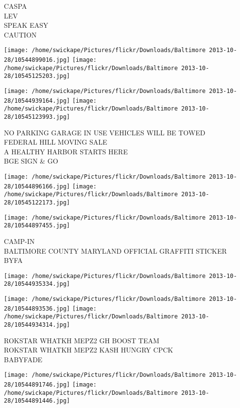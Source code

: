 \documentclass[10pt,letterpaper]{article}
\begin{document}
CASPA\\
LEV\\
SPEAK EASY\\
CAUTION\\
\pagebreak

\texttt{[image: /home/swickape/Pictures/flickr/Downloads/Baltimore 2013-10-28/10544899016.jpg]}
\texttt{[image: /home/swickape/Pictures/flickr/Downloads/Baltimore 2013-10-28/10545125203.jpg]}

\texttt{[image: /home/swickape/Pictures/flickr/Downloads/Baltimore 2013-10-28/10544939164.jpg]}
\texttt{[image: /home/swickape/Pictures/flickr/Downloads/Baltimore 2013-10-28/10545123993.jpg]}

NO PARKING GARAGE IN USE VEHICLES WILL BE TOWED\\
FEDERAL HILL MOVING SALE\\
A HEALTHY HARBOR STARTS HERE\\
BGE SIGN \& GO\\
\pagebreak

\texttt{[image: /home/swickape/Pictures/flickr/Downloads/Baltimore 2013-10-28/10544896166.jpg]}
\texttt{[image: /home/swickape/Pictures/flickr/Downloads/Baltimore 2013-10-28/10545122173.jpg]}

\vspace{0.25in}
\texttt{[image: /home/swickape/Pictures/flickr/Downloads/Baltimore 2013-10-28/10544897455.jpg]}

CAMP{-}IN\\
BALTIMORE COUNTY MARYLAND OFFICIAL GRAFFITI STICKER\\
BYFA\\
\pagebreak

\texttt{[image: /home/swickape/Pictures/flickr/Downloads/Baltimore 2013-10-28/10544935334.jpg]}

\vspace{0.25in}
\texttt{[image: /home/swickape/Pictures/flickr/Downloads/Baltimore 2013-10-28/10544893536.jpg]}
\texttt{[image: /home/swickape/Pictures/flickr/Downloads/Baltimore 2013-10-28/10544934314.jpg]}

ROKSTAR WHATKH MEPZ2 GH BOOST TEAM\\
ROKSTAR WHATKH MEPZ2 KASH HUNGRY CPCK\\
BABYFADE\\
\pagebreak

\texttt{[image: /home/swickape/Pictures/flickr/Downloads/Baltimore 2013-10-28/10544891746.jpg]}
\texttt{[image: /home/swickape/Pictures/flickr/Downloads/Baltimore 2013-10-28/10544891446.jpg]}
\end{document}
